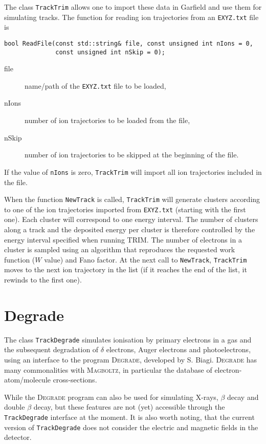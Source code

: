 The class \texttt{TrackTrim} allows one to import these data in Garfield 
and use them for simulating tracks. The function for 
reading ion trajectories from an \texttt{EXYZ.txt} file is 
\begin{lstlisting}
bool ReadFile(const std::string& file, const unsigned int nIons = 0,
              const unsigned int nSkip = 0);
\end{lstlisting}
\begin{description}
  \item[file] name/path of the \texttt{EXYZ.txt} file to be loaded,
  \item[nIons] number of ion trajectories to be loaded from the file,
  \item[nSkip] number of ion trajectories to be skipped at the beginning of the file.
\end{description}
If the value of \texttt{nIons} is zero, \texttt{TrackTrim} will 
import all ion trajectories included in the file.

When the function \texttt{NewTrack} is called, 
\texttt{TrackTrim} will generate clusters according to one of the ion 
trajectories imported from \texttt{EXYZ.txt} (starting with the first one). 
Each cluster will correspond to one energy interval. 
The number of clusters along a track and the deposited energy per cluster 
is therefore controlled by the energy interval specified when running TRIM.
The number of electrons in a cluster is sampled using an algorithm 
that reproduces the requested work function ($W$ value) and Fano factor.
At the next call to \texttt{NewTrack}, \texttt{TrackTrim} moves to the  
next ion trajectory in the list (if it reaches the end of the list, 
it rewinds to the first one). 

\section{Degrade}
The class \texttt{TrackDegrade} simulates ionisation by primary electrons 
in a gas and the subsequent degradation of $\delta$ electrons, 
Auger electrons and photoelectrons, 
using an interface to the program \textsc{Degrade}, developed by S. Biagi. 
\textsc{Degrade} has many commonalities with \textsc{Magboltz}, 
in particular the database of electron-atom/molecule cross-sections. 

While the \textsc{Degrade} program can also be used for simulating X-rays, 
$\beta$ decay and double $\beta$ decay, but these features are not (yet) 
accessible through the \texttt{TrackDegrade} interface at the moment. 
It is also worth noting, that the current version of \texttt{TrackDegrade} 
does not consider the electric and magnetic fields in the detector.

